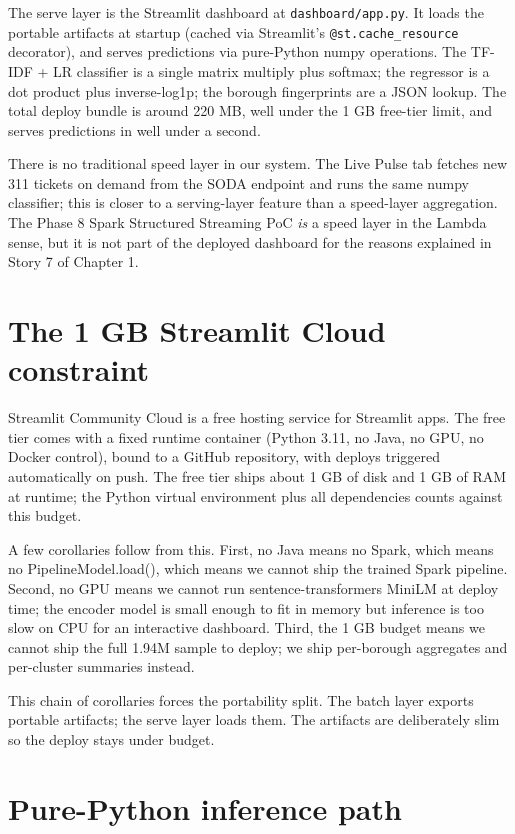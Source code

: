 \documentclass[11pt,letterpaper]{book}
\begin{document}
The serve layer is the Streamlit dashboard at \texttt{dashboard/app.py}. It loads the portable artifacts at startup (cached via Streamlit's \texttt{@st.cache\_resource} decorator), and serves predictions via pure-Python numpy operations. The TF-IDF + LR classifier is a single matrix multiply plus softmax; the regressor is a dot product plus inverse-log1p; the borough fingerprints are a JSON lookup. The total deploy bundle is around 220 MB, well under the 1 GB free-tier limit, and serves predictions in well under a second.

There is no traditional speed layer in our system. The Live Pulse tab fetches new 311 tickets on demand from the SODA endpoint and runs the same numpy classifier; this is closer to a serving-layer feature than a speed-layer aggregation. The Phase 8 Spark Structured Streaming PoC \emph{is} a speed layer in the Lambda sense, but it is not part of the deployed dashboard for the reasons explained in Story 7 of Chapter 1.

\section{The 1 GB Streamlit Cloud constraint}

Streamlit Community Cloud is a free hosting service for Streamlit apps. The free tier comes with a fixed runtime container (Python 3.11, no Java, no GPU, no Docker control), bound to a GitHub repository, with deploys triggered automatically on push. The free tier ships about 1 GB of disk and 1 GB of RAM at runtime; the Python virtual environment plus all dependencies counts against this budget.

A few corollaries follow from this. First, no Java means no Spark, which means no PipelineModel.load(), which means we cannot ship the trained Spark pipeline. Second, no GPU means we cannot run sentence-transformers MiniLM at deploy time; the encoder model is small enough to fit in memory but inference is too slow on CPU for an interactive dashboard. Third, the 1 GB budget means we cannot ship the full 1.94M sample to deploy; we ship per-borough aggregates and per-cluster summaries instead.

This chain of corollaries forces the portability split. The batch layer exports portable artifacts; the serve layer loads them. The artifacts are deliberately slim so the deploy stays under budget.

\section{Pure-Python inference path}
\end{document}

